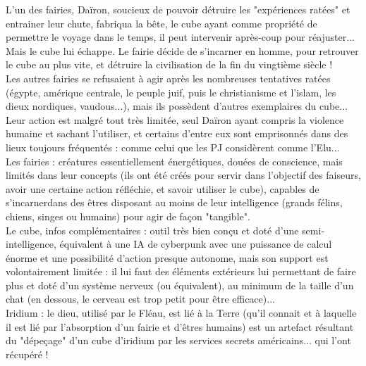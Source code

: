 \documentclass[11pt,twoside,a4paper]{book}
\begin{document}
L'un des fairies, Da{\"i}ron, soucieux de pouvoir d{\'e}truire les "exp{\'e}riences rat{\'e}es" et entrainer leur chute, fabriqua la b{\^e}te, le cube ayant comme propri{\'e}t{\'e} de permettre le voyage dans le temps, il peut intervenir apr{\`e}s-coup pour r{\'e}ajuster... Mais le cube lui {\'e}chappe. Le fairie d{\'e}cide de s'incarner en homme, pour retrouver le cube au plus vite, et d{\'e}truire la civilisation de la fin du vingti{\`e}me si{\`e}cle ! ~\\

Les autres fairies se refusaient {\`a} agir apr{\`e}s les nombreuses tentatives rat{\'e}es ({\'e}gypte, am{\'e}rique centrale, le peuple juif, puis le christianisme et l'islam, les dieux nordiques, vaudous...), mais ils poss{\`e}dent d'autres exemplaires du cube... Leur action est malgr{\'e} tout tr{\`e}s limit{\'e}e, seul Da{\"i}ron ayant compris la violence humaine et sachant l'utiliser, et certains d'entre eux sont emprisonn{\'e}s dans des lieux toujours fr{\'e}quent{\'e}s : comme celui que les PJ consid{\`e}rent comme l'Elu... ~\\

Les fairies : cr{\'e}atures essentiellement {\'e}nerg{\'e}tiques, dou{\'e}es de conscience, mais limit{\'e}s dans leur concepts (ils ont {\'e}t{\'e} cr{\'e}{\'e}s pour servir dans l'objectif des faiseurs, avoir une certaine action r{\'e}fl{\'e}chie, et savoir utiliser le cube), capables de s'incarnerdans des {\^e}tres disposant au moins de leur intelligence (grands f{\'e}lins, chiens, singes ou humains) pour agir de fa\c{c}on "tangible". ~\\

Le cube, infos compl{\'e}mentaires : outil tr{\`e}s bien con\c{c}u et dot{\'e} d'une semi-intelligence, {\'e}quivalent {\`a} une IA de cyberpunk avec une puissance de calcul {\'e}norme et une possibilit{\'e} d'action presque autonome, mais son support est volontairement limit{\'e}e : il lui faut des {\'e}l{\'e}ments ext{\'e}rieurs lui permettant de faire plus et dot{\'e} d'un syst{\`e}me nerveux (ou {\'e}quivalent), au minimum de la taille d'un chat (en dessous, le cerveau est trop petit pour {\^e}tre efficace)... ~\\

Iridium : le dieu, utilis{\'e} par le Fl{\'e}au, est li{\'e} {\`a} la Terre (qu'il connait et {\`a} laquelle il est li{\'e} par l'absorption d'un fairie et d'{\^e}tres humains) est un artefact r{\'e}sultant du "d{\'e}pe\c{c}age" d'un cube d'iridium par les services secrets am{\'e}ricains... qui l'ont r{\'e}cup{\'e}r{\'e} ! ~\\
\end{document}

